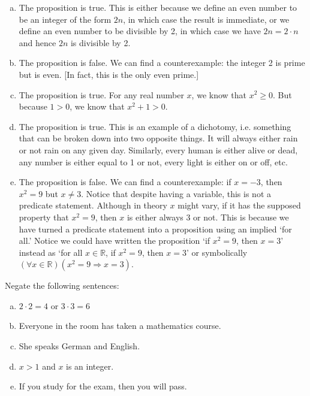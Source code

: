 \documentclass[11pt,letterpaper]{article}
\begin{document}
\sol
\begin{enumerate}[(a)]
\item The proposition is true. This is either because we define an even number to be an integer of the form $2n$, in which case the result is immediate, or we define an even number to be divisible by 2, in which case we have $2n= 2 \cdot n$ and hence $2n$ is divisible by 2. 

\item The proposition is false. We can find a counterexample: the integer 2 is prime but is even. [In fact, this is the only even prime.]

\item The proposition is true. For any real number $x$, we know that $x^2 \geq 0$. But because $1 > 0$, we know that $x^2 + 1 > 0$. 

\item The proposition is true. This is an example of a dichotomy, i.e. something that can be broken down into two opposite things. It will always either rain or not rain on any given day. Similarly, every human is either alive or dead, any number is either equal to 1 or not, every light is either on or off, etc. 

\item The proposition is false. We can find a counterexample: if $x= -3$, then $x^2= 9$ but $x \neq 3$. Notice that despite having a variable, this is not a predicate statement. Although in theory $x$ might vary, if it has the supposed property that $x^2= 9$, then $x$ is either always 3 or not. This is because we have turned a predicate statement into a proposition using an implied `for all.' Notice we could have written the proposition `if $x^2= 9$, then $x= 3$' instead as `for all $x \in \mathbb{R}$, if $x^2= 9$, then $x= 3$' or symbolically $(\forall x \in \mathbb{R}) ( x^2= 9 \Rightarrow x= 3)$.  
\end{enumerate}



\newpage



 Negate the following sentences:
	\begin{enumerate}[(a),topsep=0pt]
	\item $2 \cdot 2= 4$ or $3 \cdot 3= 6$
	\item Everyone in the room has taken a mathematics course.
	\item She speaks German and English. 
	\item $x > 1$ and $x$ is an integer.
	\item If you study for the exam, then you will pass. 
	\end{enumerate}
\end{document}
